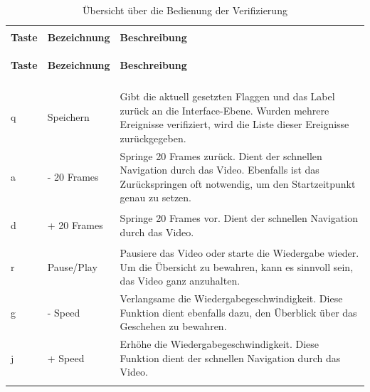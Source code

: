 \clearpage
\begin{longtable}{>{\bfseries} p{} p{} p{}}
\caption{Übersicht über die Bedienung der Verifizierung}\\
\label{tab:VeriBedienElem}\\

\textbf{Taste} & \textbf{Bezeichnung} & \textbf{Beschreibung} \\
\hline
\endfirsthead

\textbf{Taste} & \textbf{Bezeichnung} & \textbf{Beschreibung} \\
\hline
\endhead

\multicolumn{3}{r}{Fortsetzung auf der nächsten Seite...} \\
\endfoot

\hline
\endlastfoot

q & Speichern & Gibt die aktuell gesetzten Flaggen und das Label zurück an die Interface-Ebene. Wurden mehrere Ereignisse verifiziert, wird die Liste dieser Ereignisse zurückgegeben.\\
\addlinespace[0.7em] %

a & - 20 Frames & Springe 20 Frames zurück. Dient der schnellen Navigation durch das Video. Ebenfalls ist das Zurückspringen oft notwendig, um den Startzeitpunkt genau zu setzen.\\
\addlinespace[0.7em] %

d & + 20 Frames & Springe 20 Frames vor. Dient der schnellen Navigation durch das Video. \\
\addlinespace[0.7em] %

r & Pause/Play & Pausiere das Video oder starte die Wiedergabe wieder. Um die Übersicht zu bewahren, kann es sinnvoll sein, das Video ganz anzuhalten. \\
\addlinespace[0.7em] %

g & - Speed & Verlangsame die Wiedergabegeschwindigkeit. Diese Funktion dient ebenfalls dazu, den Überblick über das Geschehen zu bewahren.\\
\addlinespace[0.7em] %

j & + Speed & Erhöhe die Wiedergabegeschwindigkeit. Diese Funktion dient der schnellen Navigation durch das Video. \\
\addlinespace[0.7em] %


\end{longtable}
